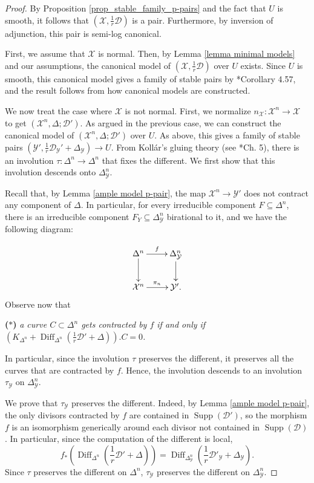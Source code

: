 \documentclass{amsart}
\newcommand{\cD}{\mathcal{D}}
\newcommand{\cX}{\mathcal{X}}
\newcommand{\cY}{\mathcal{Y}}
\newcommand{\supp}{\operatorname{Supp}}
\theoremstyle{definition}
\begin{document}
\begin{proof}
By Proposition \ref{prop_stable_family_p-pairs} and the fact that $U$ is smooth, it follows that $(\cX, \frac{1}{r}\cD)$ is a pair.
Furthermore, by inversion of adjunction, this pair is semi-log canonical.


First, we assume that $\cX$ is normal.
Then, by Lemma \ref{lemma minimal models} and our assumptions, the canonical model of $(\cX,\frac{1}{r}\cD)$ over $U$ exists.
Since $U$ is smooth, this canonical model gives a family of stable pairs by \cite{kol_new}*{Corollary 4.57}, and the result follows from how canonical models are constructed.

We now treat the case where $\cX$ is not normal.
First, we normalize $n_\cX \colon \cX^n\to \cX$ to get $(\cX^n,\Delta;\cD') $.
As argued in the previous case, we can construct the canonical model of $(\cX^n,\Delta;\cD') $ over $U$.
As above, this gives a family of stable pairs $(\cY',\frac{1}{r}\cD_\cY'+\Delta_\cY)\to U$.
From Koll\'ar's gluing theory (see \cite{Kol13}*{Ch. 5}), there is an involution $\tau \colon \Delta^n \to \Delta^n$ that fixes the different.
We first show that this involution descends onto $\Delta_\cY^n$.

Recall that, by Lemma \ref{ample model p-pair}, the map $\cX^n\to \cY'$ does not contract any component of $\Delta$.
In particular, for every irreducible component $F\subseteq \Delta^n$, there is an irreducible component $F_Y\subseteq \Delta_\cY^n$ birational to it, and we have the following diagram:

$$\xymatrix{\Delta^n\ar[r]^f \ar[d] & \Delta^n_\cY \ar[d] \\ \cX^n \ar[r]^{\pi_n} & \cY'.}$$
Observe now that
\begin{center}
    {\bf ($\ast$)} {\it a curve $C \subset \Delta^n$ gets contracted by $f$ if and only if $(K_{\Delta^n} + \operatorname{Diff}_{\Delta^n}(\frac{1}{r}\cD ' + \Delta)).C = 0$.}
\end{center}
In particular, since the involution $\tau$ preserves the different, it preserves all the curves that are contracted by $f$.
Hence, the involution descends to an involution $\tau_\cY$ on $\Delta_\cY^n$.

We prove that $\tau_\cY$ preserves the different.
Indeed, by Lemma \ref{ample model p-pair}, the only divisors contracted by $f$ are contained in $\supp(\cD')$, so the morphism $f$ is an isomorphism generically around each divisor not contained in $\supp(\cD)$.
In particular, since the computation of the different is local,
\[
f_*(\operatorname{Diff}_{\Delta^n}(\frac{1}{r}\cD' + \Delta)) = \operatorname{Diff}_{\Delta^n_\cY}(\frac{1}{r}\cD'_\cY + \Delta_\cY).
\]
Since $\tau$ preserves the different on $\Delta^n$, $\tau_\cY$ preserves the different on $\Delta_\cY^n$.


\end{proof}
\end{document}
